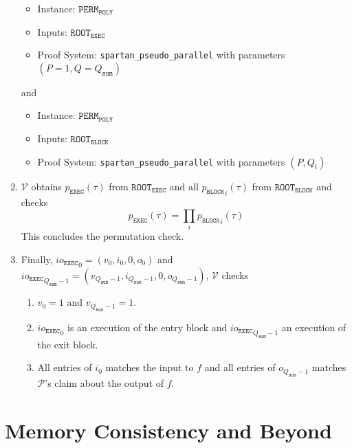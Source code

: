 \documentclass{article}
\newcommand{\code}{\texttt}
\newcommand{\Qsum}{Q_{\mathtt{sum}}}
\renewcommand{\P}{\mathcal{P}}
\newcommand{\V}{\mathcal{V}}
\newcommand{\ioe}{io_{\mathtt{EXEC}}}
\newcommand{\ROOTE}{\mathtt{ROOT_{EXEC}}}
\newcommand{\ROOTB}{\mathtt{ROOT_{BLOCK}}}
\begin{document}
\begin{enumerate}
\begin{itemize}
        \item Instance: $\mathtt{PERM}_\mathtt{POLY}$
        \item Inputs: $\ROOTE$
        \item Proof System: \code{spartan\_pseudo\_parallel} with parameters $(P = 1, Q = \Qsum)$
    \end{itemize}
    and
    \begin{itemize}
        \item Instance: $\mathtt{PERM}_\mathtt{POLY}$
        \item Inputs: $\ROOTB$
        \item Proof System: \code{spartan\_pseudo\_parallel} with parameters $(P, Q_i)$
    \end{itemize}
    \item $\V$ obtains $p_\mathtt{EXEC}(\tau)$ from $\ROOTE$ and all ${p_\mathtt{BLOCK}}_i(\tau)$ from $\ROOTB$ and checks 
    $$p_\mathtt{EXEC}(\tau) = \prod_i {p_\mathtt{BLOCK}}_i(\tau)$$
    This concludes the permutation check.
    \item Finally, ${\ioe}_0 = (v_0, i_0, 0, o_0)$ and ${\ioe}_{\Qsum - 1} = (v_{\Qsum - 1}, i_{\Qsum - 1}, 0, o_{\Qsum - 1})$, $\V$ checks
    \begin{enumerate}
        \item $v_0 = 1$ and $v_{\Qsum - 1} = 1$.
        \item ${\ioe}_0$ is an execution of the entry block and ${\ioe}_{\Qsum - 1}$ an execution of the exit block.
        \item All entries of $i_0$ matches the input to $f$ and all entries of $o_{\Qsum - 1}$ matches $\P$'s claim about the output of $f$.
    \end{enumerate}
\end{enumerate}


\section{Memory Consistency and Beyond}
\end{document}
